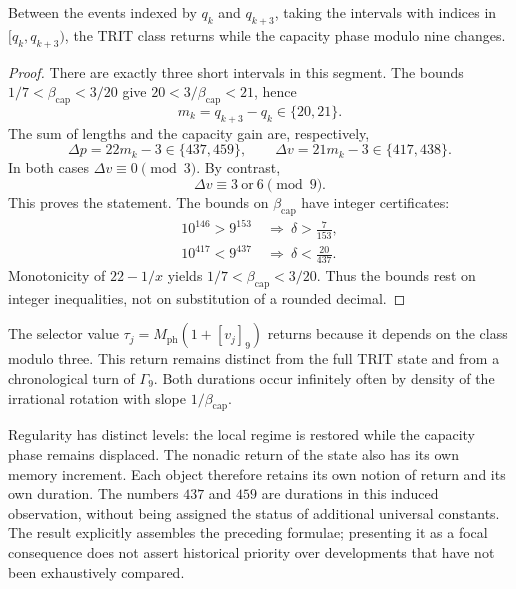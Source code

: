 \begin{proposition}
\label{md:restop:proposicion-regimen}
Between the events indexed by $q_k$ and $q_{k+3}$, taking the intervals with
indices in $[q_k,q_{k+3})$, the TRIT class returns while the capacity phase
modulo nine changes.
\end{proposition}
\begin{proof}
There are exactly three short intervals in this segment.
The bounds $1/7<\beta_{\mathrm{cap}}<3/20$ give
$20<3/\beta_{\mathrm{cap}}<21$, hence
\begin{equation}
 m_k=q_{k+3}-q_k\in\{20,21\}.
 \label{md:restop:duracion-tritica}
\end{equation}
The sum of lengths and the capacity gain are, respectively,
\begin{equation}
 \Delta p=22m_k-3\in\{437,459\},\qquad
 \Delta v=21m_k-3\in\{417,438\}.
 \label{md:restop:ganancias}
\end{equation}
In both cases $\Delta v\equiv0\pmod3$. By contrast,
\begin{equation}
 \boxed{\Delta v\equiv3\ \text{or}\ 6\pmod9.}
 \label{md:restop:desplazamiento-nonadico}
\end{equation}
This proves the statement.
The bounds on $\beta_{\mathrm{cap}}$ have integer certificates:
\begin{equation}
 \begin{aligned}
 10^{146}>9^{153}&\ \Longrightarrow\
 \delta>\frac7{153},\\
 10^{417}<9^{437}&\ \Longrightarrow\
 \delta<\frac{20}{437}.
 \end{aligned}
 \label{md:restop:certificados-cotas}
\end{equation}
Monotonicity of $22-1/x$ yields
$1/7<\beta_{\mathrm{cap}}<3/20$. Thus the bounds rest on
integer inequalities, not on substitution of a rounded decimal.
\end{proof}

The selector value
$\tau_j=M_{\mathrm{ph}}(1+[v_j]_9)$ returns because it depends on the class
modulo three. This return remains distinct from the full TRIT
state and from a chronological turn of $\Gamma_9$.
Both durations occur infinitely often by density of the irrational rotation
with slope $1/\beta_{\mathrm{cap}}$.

Regularity has distinct levels: the local regime is restored
while the capacity phase remains displaced. The nonadic return of the
state also has its own memory increment. Each object
therefore retains its own notion of return and its own duration.
The numbers $437$ and $459$ are durations in this induced observation,
without being assigned the status of additional universal constants.
The result explicitly assembles the preceding formulae; presenting it
as a focal consequence does not assert historical priority
over developments that have not been exhaustively compared.

